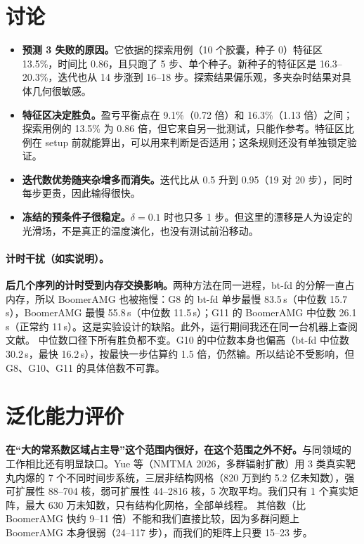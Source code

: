 \documentclass[11pt,a4paper]{ctexart}
\begin{document}
\section{讨论}
\begin{itemize}
\item \textbf{预测 3 失败的原因。}它依据的探索用例（10 个胶囊，种子 0）特征区 13.5\%，时间比 0.86，且只跑了 5 步、单个种子。新种子的特征区是 16.3--20.3\%，迭代也从 14 步涨到 16--18 步。探索结果偏乐观，多夹杂时结果对具体几何很敏感。
\item \textbf{特征区决定胜负。}盈亏平衡点在 9.1\%（0.72 倍）和 16.3\%（1.13 倍）之间；探索用例的 13.5\% 为 0.86 倍，但它来自另一批测试，只能作参考。特征区比例在 setup 前就能算出，可以用来判断是否适用；这条规则还没有单独锁定验证。
\item \textbf{迭代数优势随夹杂增多而消失。}迭代比从 0.5 升到 0.95（19 对 20 步），同时每步更贵，因此输得很快。
\item \textbf{冻结的预条件子很稳定。}$\delta=0.1$ 时也只多 1 步。但这里的漂移是人为设定的光滑场，不是真正的温度演化，也没有测试前沿移动。
\end{itemize}

\paragraph{计时干扰（如实说明）。}\textbf{后几个序列的计时受到内存交换影响。}两种方法在同一进程，bt-fd 的分解一直占内存，所以 BoomerAMG 也被拖慢：G8 的 bt-fd 单步最慢 83.5\,s（中位数 15.7\,s），BoomerAMG 最慢 55.8\,s（中位数 11.5\,s）；G11 的 BoomerAMG 中位数 26.1\,s（正常约 11\,s）。这是实验设计的缺陷。此外，运行期间我还在同一台机器上查阅文献。
中位数口径下所有胜负都不变。G10 的中位数本身也偏高（bt-fd 中位数 30.2\,s，最快 16.2\,s），按最快一步估算约 1.5 倍，仍然输。所以结论不受影响，但 G8、G10、G11 的具体倍数不可靠。

\section{泛化能力评价}
\textbf{在“大的常系数区域占主导”这个范围内很好，在这个范围之外不好。}与同领域的工作相比还有明显缺口。Yue 等（NMTMA 2026，多群辐射扩散）用 3 类真实靶丸内爆的 7 个不同时间步系统，三层非结构网格（820 万到约 5.2 亿未知数），强可扩展性 88--704 核，弱可扩展性 44--2816 核，5 次取平均。我们只有 1 个真实矩阵，最大 630 万未知数，只有结构化网格，全部单线程。
其倍数（比 BoomerAMG 快约 9--11 倍）不能和我们直接比较，因为多群问题上 BoomerAMG 本身很弱（24--117 步），而我们的矩阵上只要 15--23 步。
\end{document}
